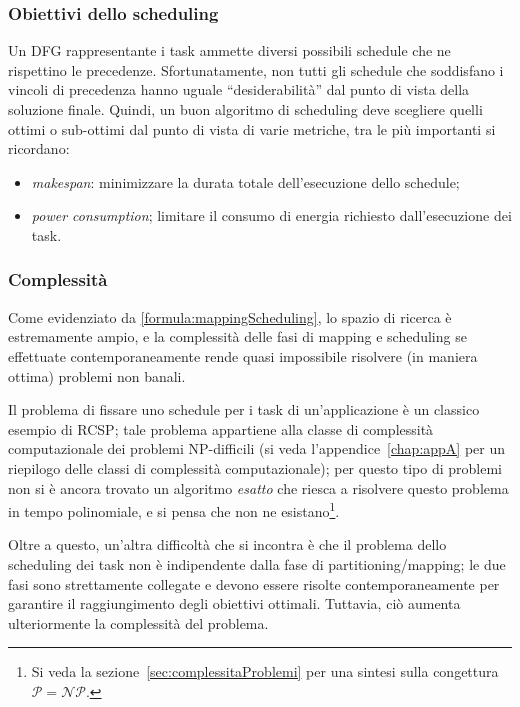\subsubsection{Obiettivi dello scheduling}
Un \ac{DFG} rappresentante i task ammette diversi possibili schedule che ne rispettino le 
precedenze. Sfortunatamente, non tutti gli schedule che soddisfano i vincoli di precedenza
hanno uguale ``desiderabilità'' dal punto di vista della soluzione finale. Quindi, un buon
algoritmo di scheduling deve scegliere quelli ottimi o sub-ottimi dal punto di vista di
varie metriche, tra le più importanti si ricordano:
\begin{itemize}
 \item \emph{makespan}: minimizzare la durata totale dell'esecuzione dello schedule;
 \item \emph{power consumption}; limitare il consumo di energia richiesto 
dall'esecuzione dei task.
\end{itemize}


\subsubsection{Complessità}
Come evidenziato da \eqref{formula:mappingScheduling}, lo spazio di ricerca è 
estremamente ampio, e la complessità delle fasi di mapping e scheduling se effettuate 
contemporaneamente rende quasi impossibile risolvere (in maniera ottima) problemi non 
banali.

Il problema di fissare uno schedule per i task di un'applicazione è un classico esempio 
di \ac{RCSP}; tale problema appartiene alla classe di complessità computazionale dei 
problemi NP-difficili (si veda l'appendice~\ref{chap:appA} per un riepilogo delle classi 
di complessità computazionale); per questo tipo di problemi non si è ancora trovato un 
algoritmo \emph{esatto} che riesca a risolvere questo problema in tempo 
polinomiale, e si pensa che non ne esistano\footnote{Si veda la
sezione~\ref{sec:complessitaProblemi} per una sintesi sulla congettura $\mathcal{P} = 
\mathcal{NP}$.}.

Oltre a questo, un'altra difficoltà che si incontra è che il problema dello scheduling 
dei task non è indipendente dalla fase di partitioning/mapping; le due fasi sono strettamente 
collegate e devono essere risolte contemporaneamente per garantire il raggiungimento 
degli obiettivi ottimali. Tuttavia, ciò aumenta ulteriormente la complessità del 
problema.


